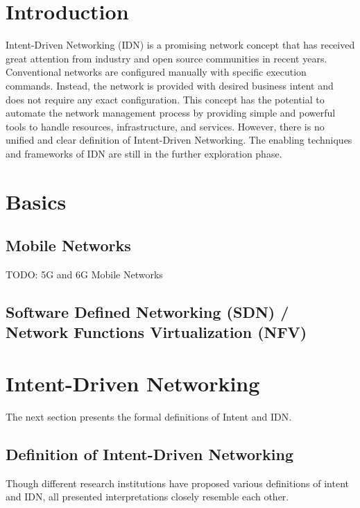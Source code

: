 




\tableofcontents

\clearpage
{}

\section{Introduction}
\label{sec:Introduction}
Intent-Driven Networking (IDN) is a promising network concept that has received great attention from industry and open source communities in recent years. Conventional networks are configured manually with specific execution commands. Instead, the network is provided with desired business intent and does not require any exact configuration. This concept has the potential to automate the network management process by providing simple and powerful tools to handle resources, infrastructure, and services\cite{Mwanje2021}. However, there is no unified and clear definition of Intent-Driven Networking. The enabling techniques and frameworks of IDN are still in the further exploration phase\cite{8968429}.

\section{Basics}
\label{sec:Basics}

\subsection{Mobile Networks}
TODO: 5G and 6G Mobile Networks

\subsection{Software Defined Networking (SDN) / Network Functions Virtualization (NFV)}


\section{Intent-Driven Networking}
\label{sec:Intent_Driven_Networking}
The next section presents the formal definitions of Intent and IDN. 

\subsection{Definition of Intent-Driven Networking}
Though different research institutions have proposed various definitions of intent and IDN, all presented interpretations closely resemble each other. 

